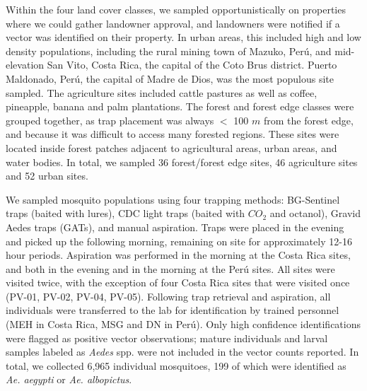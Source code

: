 Within the four land cover classes, we sampled opportunistically on properties where we could gather landowner approval, and landowners were notified if a vector was identified on their property. In urban areas, this included high and low density populations, including the rural mining town of Mazuko, Perú, and mid-elevation San Vito, Costa Rica, the capital of the Coto Brus district. Puerto Maldonado, Perú, the capital of Madre de Dios, was the most populous site sampled. The agriculture sites included cattle pastures as well as coffee, pineapple, banana and palm plantations. The forest and forest edge classes were grouped together, as trap placement was always $<$ 100 $m$ from the forest edge, and because it was difficult to access many forested regions. These sites were located inside forest patches adjacent to agricultural areas, urban areas, and water bodies. In total, we sampled 36 forest/forest edge sites, 46 agriculture sites and 52 urban sites.

We sampled mosquito populations using four trapping methods: BG-Sentinel traps (baited with lures), CDC light traps (baited with $CO_2$ and octanol), Gravid Aedes traps (GATs), and manual aspiration. Traps were placed in the evening and picked up the following morning, remaining on site for approximately 12-16 hour periods. Aspiration was performed in the morning at the Costa Rica sites, and both in the evening and in the morning at the Perú sites. All sites were visited twice, with the exception of four Costa Rica sites that were visited once (PV-01, PV-02, PV-04, PV-05). Following trap retrieval and aspiration, all individuals were transferred to the lab for identification by trained personnel (MEH in Costa Rica, MSG and DN in Perú). Only high confidence identifications were flagged as positive vector observations; mature individuals and larval samples labeled as \textit{Aedes} spp. were not included in the vector counts reported. In total, we collected 6,965 individual mosquitoes, 199 of which were identified as \textit{Ae. aegypti} or \textit{Ae. albopictus}.


